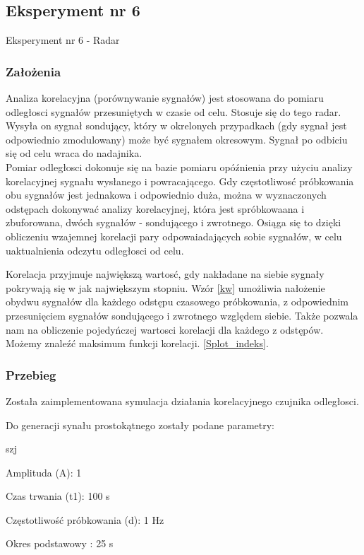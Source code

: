 \documentclass[12pt]{article}
\begin{document}
\subsection{Eksperyment nr 6}

Eksperyment nr 6 - Radar\\

\subsubsection{Założenia}
Analiza korelacyjna (porównywanie sygnałów) jest stosowana do pomiaru odległosci sygnałów przesuniętych w czasie od celu. Stosuje się do tego radar. Wysyła on sygnał sondujący, który w okrelonych przypadkach (gdy sygnał jest odpowiednio zmodulowany) może być sygnałem okresowym.
Sygnał po odbiciu się od celu wraca do nadajnika.
\\Pomiar odległosci dokonuje się na bazie pomiaru opóźnienia przy użyciu analizy korelacyjnej sygnału wysłanego i powracającego.
Gdy częstotliwosć próbkowania obu sygnałów jest jednakowa i odpowiednio duża, można w wyznaczonych odstępach dokonywać analizy korelacyjnej, która jest spróbkowaana i zbuforowana, dwóch sygnałów -  sondującego i zwrotnego. Osiąga się to dzięki obliczeniu wzajemnej korelacji pary odpowaiadających sobie sygnałów, w celu uaktualnienia odczytu odległosci od celu. 

Korelacja przyjmuje największą wartosć, gdy nakładane na siebie sygnały pokrywają się w jak największym stopniu. Wzór \ref{kw} umożliwia nałożenie obydwu
sygnałów dla każdego odstępu czasowego próbkowania, z odpowiednim przesunięciem sygnałów sondującego i zwrotnego względem siebie. Także pozwala nam na obliczenie pojedyńczej wartosci korelacji dla każdego z odstępów. Możemy znaleźć maksimum funkcji korelacji. 
 \ref{Splot_indeks}.

\subsubsection{Przebieg}
Została zaimplementowana symulacja działania korelacyjnego czujnika odległosci.

Do generacji synału prostokątnego zostały podane parametry:

\begin{labeling}{szj}
\item [Amplituda (A):] 1
\item [Czas trwania (t1):] 100 s
\item [Częstotliwość próbkowania (d): ] 1 Hz
\item [Okres podstawowy :] 25 s
\end{labeling}
\end{document}
